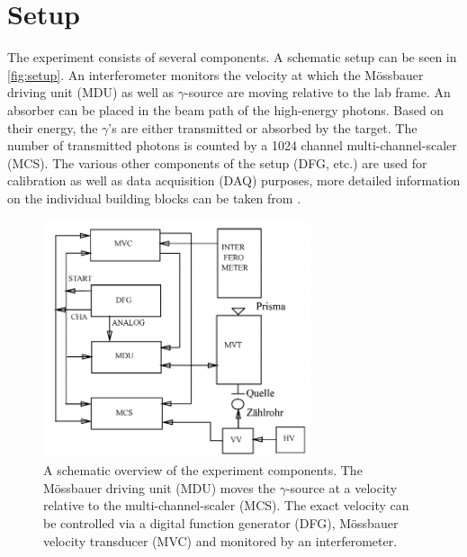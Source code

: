 
\section{Setup}
\label{sec:setup}

The experiment consists of several components. A schematic setup can be seen in 
\autoref{fig:setup}. An interferometer monitors the velocity at which the Mössbauer 
driving unit (MDU) as well as $\gamma$-source are moving relative to the lab frame.
An absorber can be placed in the beam path of the high-energy photons. Based on their
energy, the $\gamma$'s are either transmitted or absorbed by the target. The number 
of transmitted photons is counted by a 1024 channel multi-channel-scaler (MCS). The 
various other components of the setup (DFG, etc.) are used for calibration as 
well as data acquisition (DAQ) purposes, more detailed information on the individual
building blocks can be taken from \cite{Sch17}.

\begin{figure}[h]
	\centering
	\label{fig:setup}
	\includegraphics[width=0.7\textwidth]{./fig/setup.png}
	\caption{A schematic overview of the experiment components. The Mössbauer 
	driving unit (MDU) moves the $\gamma$-source at a velocity relative to the 
	multi-channel-scaler (MCS). The exact velocity can be controlled via a 
	digital function generator (DFG), Mössbauer velocity transducer (MVC) and 
	monitored by an interferometer.}
\end{figure}
